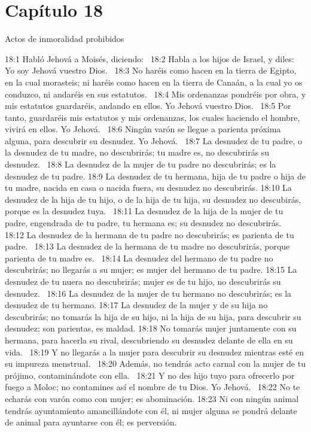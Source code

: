 \section*{Capítulo 18}
Actos de inmoralidad prohibidos  

18:1 Habló Jehová a Moisés, diciendo:  
18:2 Habla a los hijos de Israel, y diles: Yo soy Jehová vuestro Dios.  
18:3 No haréis como hacen en la tierra de Egipto, en la cual morasteis; ni haréis como hacen en la tierra de Canaán, a la cual yo os conduzco, ni andaréis en sus estatutos.  
18:4 Mis ordenanzas pondréis por obra, y mis estatutos guardaréis, andando en ellos. Yo Jehová vuestro Dios.  
18:5 Por tanto, guardaréis mis estatutos y mis ordenanzas, los cuales haciendo el hombre, vivirá en ellos. Yo Jehová.  
18:6 Ningún varón se llegue a parienta próxima alguna, para descubrir su desnudez. Yo Jehová.  
18:7 La desnudez de tu padre, o la desnudez de tu madre, no descubrirás; tu madre es, no descubrirás su desnudez.  
18:8 La desnudez de la mujer de tu padre no descubrirás; es la desnudez de tu padre. 
18:9 La desnudez de tu hermana, hija de tu padre o hija de tu madre, nacida en casa o nacida fuera, su desnudez no descubrirás. 
18:10 La desnudez de la hija de tu hijo, o de la hija de tu hija, su desnudez no descubirás, porque es la desnudez tuya.  
18:11 La desnudez de la hija de la mujer de tu padre, engendrada de tu padre, tu hermana es; su desnudez no descubrirás.  
18:12 La desnudez de la hermana de tu padre no descubrirás; es parienta de tu padre.  
18:13 La desnudez de la hermana de tu madre no descubrirás, porque parienta de tu madre es.  
18:14 La desnudez del hermano de tu padre no descubrirás; no llegarás a su mujer; es mujer del hermano de tu padre. 
18:15 La desnudez de tu nuera no descubrirás; mujer es de tu hijo, no descubrirás su desnudez.  
18:16 La desnudez de la mujer de tu hermano no descubrirás; es la desnudez de tu hermano. 
18:17 La desnudez de la mujer y de su hija no descubrirás; no tomarás la hija de su hijo, ni la hija de su hija, para descubrir su desnudez; son parientas, es maldad. 
18:18 No tomarás mujer juntamente con su hermana, para hacerla su rival, descubriendo su desnudez delante de ella en su vida.  
18:19 Y no llegarás a la mujer para descubrir su desnudez mientras esté en su impureza menstrual.  
18:20 Además, no tendrás acto carnal con la mujer de tu prójimo, contaminándote con ella.  
18:21 Y no des hijo tuyo para ofrecerlo por fuego a Moloc; no contamines así el nombre de tu Dios. Yo Jehová.  
18:22 No te echarás con varón como con mujer; es abominación. 
18:23 Ni con ningún animal tendrás ayuntamiento amancillándote con él, ni mujer alguna se pondrá delante de animal para ayuntarse con él; es perversión.  

